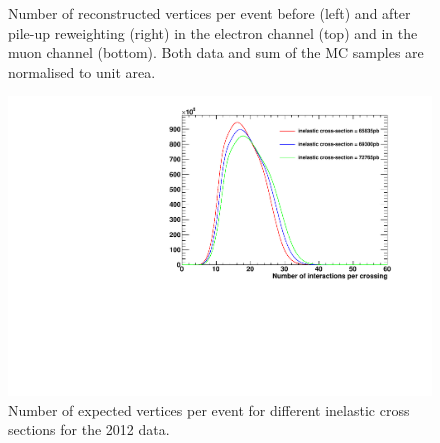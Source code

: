 \begin{figure}[!htpb]
\begin{center}
	\caption{\label{fig:pileup_vertices}
    Number of reconstructed vertices per event before (left) and after pile-up reweighting (right) in the electron
    channel (top) and in the muon channel (bottom). Both data and sum of the MC samples are normalised to unit area.}
\end{center}
\end{figure}

 \begin{figure}[hbtp]
   \centering
     \includegraphics[width=\textwidth]{vertices/PileUp_2012_truth_data.pdf}
     \caption{Number of expected vertices per event for different inelastic cross sections for the 2012 data.}
     \label{fig:pileup_truth}
 \end{figure}

